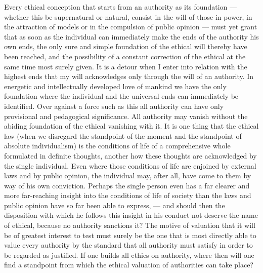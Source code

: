 \documentclass[12pt,a4paper,openany]{book}
\begin{document}
Every ethical conception that starts from an authority as its foundation --- whether this be
supernatural or natural, consist in the will of those in power, in the attraction of models or in the
compulsion of public opinion --- must yet grant that as soon as the individual can immediately make
the ends of the authority his own ends, the only sure and simple foundation of the ethical will thereby
have been reached, and the possibility of a constant correction of the ethical at the same time most
surely given. It is a detour when I enter into relation with the highest ends that my will
acknowledges only through the will of an authority. In energetic and intellectually developed love of
mankind we have the only foundation where the individual and the universal ends can immediately be
identified. Over against a force such as this all authority can have only provisional and pedagogical
significance. All authority may vanish without the abiding foundation of the ethical vanishing with
it. It is one thing that the ethical law (when we disregard the standpoint of the moment and the
standpoint of absolute individualism) is the conditions of life of a comprehensive whole formulated
in definite thoughts, another how these thoughts are acknowledged by the single individual. Even where
those conditions of life are enjoined by external laws and by public opinion, the individual may, after
all, have come to them by way of his own conviction. Perhaps the single person even has a far clearer
and more far-reaching insight into the conditions of life of society than the laws and public opinion
have so far been able to express, --- and should then the disposition with which he follows this
insight in his conduct not deserve the name of ethical, because no authority sanctions it? The motive
of valuation that it will be of greatest interest to test must surely be the one that is most directly
able to value every authority by the standard that all authority must satisfy in order to be regarded
as justified. If one builds all ethics on authority, where then will one find a standpoint from which
the ethical valuation of authorities can take place?
\end{document}
